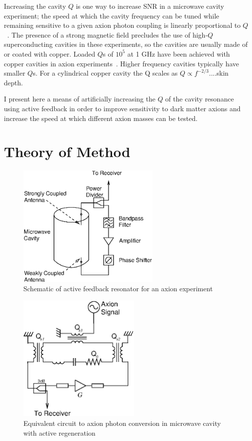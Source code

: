 \documentclass[aps,prl,twocolumn,groupedaddress]{revtex4-1}
\begin{document}
Increasing the cavity $Q$ is one way to increase SNR in a microwave cavity experiment; the speed at which the cavity frequency can be tuned while remaining sensitive to a given axion photon coupling is linearly proportional to $Q$~\cite{Peng2000569}.
The presence of a strong magnetic field precludes the use of high-$Q$ superconducting cavities in these experiments, so the cavities are usually made of or coated with copper.
Loaded $Q$s of $10^5$ at 1 GHz have been achieved with copper cavities in axion experiments~\cite{Peng2000569}.  Higher frequency cavities typically have smaller $Q$s.
For a cylindrical copper cavity the Q scales as $Q \propto f^{-2/3}$....skin depth.

I present here a means of artificially increasing the $Q$ of the cavity resonance using active feedback in order to improve sensitivity to dark matter axions and increase the speed at which different axion masses can be tested.

\section{Theory of Method}

\begin{figure}
\includegraphics[width=7cm]{figs/experiment_schematic.eps}
\caption{\label{fig:experiment_schematic} Schematic of active feedback resonator for an axion experiment}
\end{figure}

\begin{figure}
\includegraphics[width=6cm]{figs/equivalent_circuit.eps}
\caption{\label{fig:equiv_circuit} Equivalent circuit to axion photon conversion in microwave cavity with active regeneration}
\end{figure}
\end{document}
